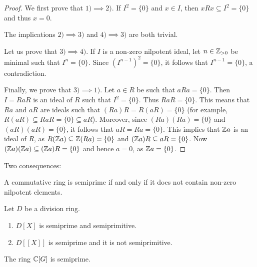 \begin{proof}
	We first prove that $1)\implies2)$. If $I^2=\{0\}$ and $x\in I$, then
	$xRx\subseteq I^2=\{0\}$ and thus $x=0$. 
    
    The implications $2)\implies3)$
	and $4)\implies3)$ are both trivial. 
    
    Let us prove that $3)\implies4)$.  If
	$I$ is a non-zero nilpotent ideal, let $n\in\mathbb{Z}_{>0}$ be minimal such that
	$I^n=\{0\}$.  Since $(I^{n-1})^2=\{0\}$, it follows that $I^{n-1}=\{0\}$, a
	contradiction.  
    
    Finally, we prove that $3)\implies1)$. Let $a\in R$ be such
	that $aRa=\{0\}$. Then $I=RaR$ is an ideal of $R$ such that $I^2=\{0\}$. Thus 
	$RaR=\{0\}$. This means that $Ra$ and $aR$ are ideals such that
	$(Ra)R=R(aR)=\{0\}$ (for example, $R(aR)\subseteq RaR=\{0\}\subseteq aR$). 
	Moreover, since $(Ra)(Ra)=\{0\}$ and $(aR)(aR)=\{0\}$, it follows that
	$aR=Ra=\{0\}$. 
	This implies that $\mathbb{Z} a$ is an ideal of $R$, as $R(\mathbb{Z} a)\subseteq \mathbb{Z}(Ra)=\{0\}$ and 
	$(\mathbb{Z} a)R\subseteq aR=\{0\}$. Now $(\mathbb{Z} a)(\mathbb{Z} a)\subseteq (\mathbb{Z} a)R=\{0\}$ and hence
	$a=0$, as $\mathbb{Z} a=\{0\}$. 
\end{proof}

Two consequences:

\begin{exercise}
	A commutative ring is semiprime if and only if it does not contain non-zero
	nilpotent elements. 
\end{exercise}


\begin{exercise}
\label{xca:D_semiprime_semiprimitive}
	Let $D$ be a division ring. 
	\begin{enumerate}
		\item $D[X]$ is semiprime and semiprimitive.
		\item $D[\![X]\!]$ is semiprime and it is not semiprimitive.
	\end{enumerate}
\end{exercise}


\begin{corollary}
\label{cor:C[G]_semiprime}
	The ring $\mathbb{C}[G]$ is semiprime.
\end{corollary}

